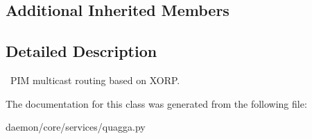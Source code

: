 \subsection*{Additional Inherited Members}


\subsection{Detailed Description}
\begin{DoxyVerb}\
PIM multicast routing based on XORP.
\end{DoxyVerb}
 

The documentation for this class was generated from the following file\+:\begin{DoxyCompactItemize}
\item 
daemon/core/services/quagga.\+py\end{DoxyCompactItemize}
